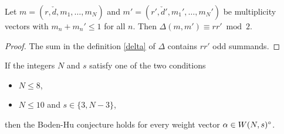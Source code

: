 \documentclass{article}
\begin{document}
\begin{lemma} \label{parity}
  Let $m = (r, \check{d}, m_1, \ldots, m_N)$ and $m' = (r', \check{d}', m_1', \ldots, m_N')$ be multiplicity vectors with $m_n + m_n' \leq 1$ for all
  $n$. Then $\Delta(m, m') \equiv r r' \bmod 2$.
\end{lemma}
\begin{proof}
  The sum in the definition \ref{delta} of $\Delta$ contains $r r'$ odd summands.
\end{proof}

\begin{thm} \label{small_rank}
  If the integers $N$ and $s$ satisfy one of the two conditions
  \begin{itemize}
   \item[i)] $N \leq 8$,
   \item[ii)] $N \leq 10$ and $s \in \{3, N-3\}$,
  \end{itemize}
  then the Boden-Hu conjecture holds for every weight vector $\alpha \in W(N, s)^{\circ}$.
\end{thm}
\end{document}
